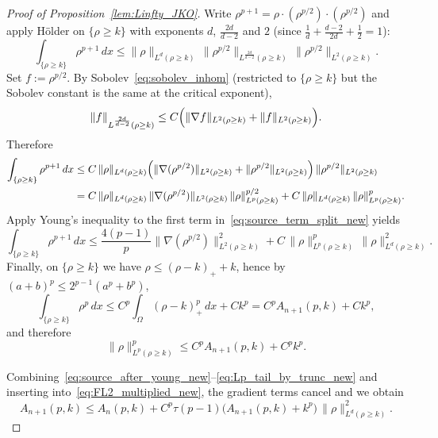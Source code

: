 \documentclass[a4paper,twosided, 11pt]{article}
\theoremstyle{plain}
\theoremstyle{remark}
\numberwithin{equation}{section}
\begin{document}
{\begin{proof}[Proof of Proposition~\ref{lem:Linfty_JKO}]
Write $\rho^{p+1}=\rho\cdot(\rho^{p/2})\cdot(\rho^{p/2})$ and apply H\"older on $\{\rho\ge k\}$ with exponents
$d$, $\frac{2d}{d-2}$ and $2$ (since $\frac1d+\frac{d-2}{2d}+\frac12=1$):
\[
\int_{\{\rho\ge k\}}\rho^{p+1}\,dx
\le
\|\rho\|_{L^d(\rho\ge k)}\,
\|\rho^{p/2}\|_{L^{\frac{2d}{d-2}}(\rho\ge k)}\,
\|\rho^{p/2}\|_{L^{2}(\rho\ge k)}.
\]
Set $f:=\rho^{p/2}$. By Sobolev~\eqref{eq:sobolev_inhom} (restricted to $\{\rho\ge k\}$ but the Sobolev constant is the same at the critical exponent),
\[
\|f\|_{L^{\frac{2d}{d-2}}(\rho\ge k)}
\le C\Bigl(\|\nabla f\|_{L^2(\rho\ge k)}+\|f\|_{L^2(\rho\ge k)}\Bigr).
\]
Therefore
\begin{align}
\int_{\{\rho\ge k\}}\rho^{p+1}\,dx
&\le C\,\|\rho\|_{L^d(\rho\ge k)}
\Bigl(\|\nabla(\rho^{p/2})\|_{L^2(\rho\ge k)}+\|\rho^{p/2}\|_{L^2(\rho\ge k)}\Bigr)\,
\|\rho^{p/2}\|_{L^{2}(\rho\ge k)} \notag\\
&= C\,\|\rho\|_{L^d(\rho\ge k)}\,\|\nabla(\rho^{p/2})\|_{L^2(\rho\ge k)}\,\|\rho\|_{L^p(\rho\ge k)}^{p/2}
+ C\,\|\rho\|_{L^d(\rho\ge k)}\,\|\rho\|_{L^p(\rho\ge k)}^{p}.
\label{eq:source_term_split_new}
\end{align}
Apply Young's inequality to the first term in~\eqref{eq:source_term_split_new}  yields
\begin{equation}\label{eq:source_after_young_new}
\int_{\{\rho\ge k\}}\rho^{p+1}\,dx
\le
\frac{4(p-1)}{p}\|\nabla(\rho^{p/2})\|_{L^2(\rho\ge k)}^2
+ C\,\|\rho\|_{L^p(\rho\ge k)}^{p}\,\|\rho\|_{L^d(\rho\ge k)}^{2}.
\end{equation}
Finally, on $\{\rho\ge k\}$ we have $\rho\le (\rho-k)_+ + k$, hence by $(a+b)^p\le 2^{p-1}(a^p+b^p)$,
\[
\int_{\{\rho\ge k\}}\rho^p\,dx
\le C^p\int_\Omega (\rho-k)_+^p\,dx + Ck^p = C^p A_{n+1}(p,k)+Ck^p,
\]
and therefore
\begin{equation}\label{eq:Lp_tail_by_trunc_new}
\|\rho\|_{L^p(\rho\ge k)}^{p}\le C^p A_{n+1}(p,k)+C^pk^p.
\end{equation}

Combining~\eqref{eq:source_after_young_new}--\eqref{eq:Lp_tail_by_trunc_new} and inserting into~\eqref{eq:FL2_multiplied_new},
the gradient terms cancel and we obtain
\begin{equation}\label{eq:trunc_recursion_new}
A_{n+1}(p,k)
\le A_n(p,k)
+ C^p\tau (p-1)\bigl(A_{n+1}(p,k)+k^p\bigr)\,\|\rho\|_{L^d(\rho\ge k)}^{2}.
\end{equation}


\end{proof}}
\end{document}
